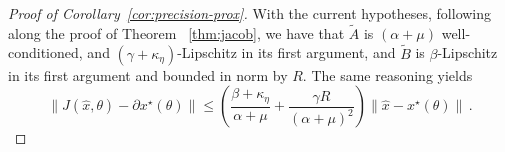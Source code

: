 \documentclass{article}
\begin{document}
\begin{proof}[Proof of Corollary~\ref{cor:precision-prox}]
With the current hypotheses, following along the proof of Theorem ~\ref{thm:jacob}, we have that $\tilde A$ is $(\alpha + \mu)$ well-conditioned, and $(\gamma + \kappa_\eta)$-Lipschitz in its first argument, and $\tilde B$ is $\beta$-Lipschitz in its first argument and bounded in norm by $R$. The same reasoning yields
\[
\|J(\hat x, \theta) - \partial x^\star (\theta)\| \le \left(\frac{\beta + \kappa_\eta}{\alpha + \mu} + \frac{\gamma R}{(\alpha + \mu)^2}\right) \|\hat x - x^\star(\theta)\|\, .
\]
\end{proof}
\end{document}
